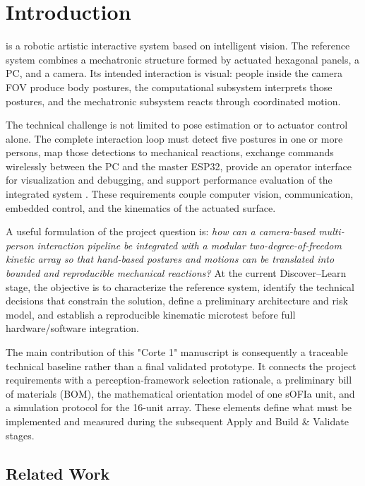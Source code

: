 \documentclass[lettersize,journal]{IEEEtran}
\begin{document}
\section{Introduction}
\label{sec:introduction}

 is a robotic artistic interactive system based on intelligent vision. The reference system combines a mechatronic structure formed by actuated hexagonal panels, a PC, and a camera. Its intended interaction is visual: people inside the camera FOV produce body postures, the computational subsystem interprets those postures, and the mechatronic subsystem reacts through coordinated motion.

The technical challenge is not limited to pose estimation or to actuator control alone. The complete interaction loop must detect five postures in one or more persons, map those detections to mechanical reactions, exchange commands wirelessly between the PC and the master ESP32, provide an operator interface for visualization and debugging, and support performance evaluation of the integrated system \cite{labdst2026sc}. These requirements couple computer vision, communication, embedded control, and the kinematics of the actuated surface.

A useful formulation of the project question is: \emph{how can a camera-based multi-person interaction pipeline be integrated with a modular two-degree-of-freedom kinetic array so that hand-based postures and motions can be translated into bounded and reproducible mechanical reactions?} At the current Discover--Learn stage, the objective is to characterize the reference system, identify the technical decisions that constrain the solution, define a preliminary architecture and risk model, and establish a reproducible kinematic microtest before full hardware/software integration.

The main contribution of this "Corte 1" manuscript is consequently a traceable technical baseline rather than a final validated prototype. It connects the project requirements with a perception-framework selection rationale, a preliminary bill of materials (BOM), the mathematical orientation model of one sOFIa unit, and a simulation protocol for the 16-unit array. These elements define what must be implemented and measured during the subsequent Apply and Build \& Validate stages.

\subsection{Related Work}
\label{sec:related}
\end{document}
